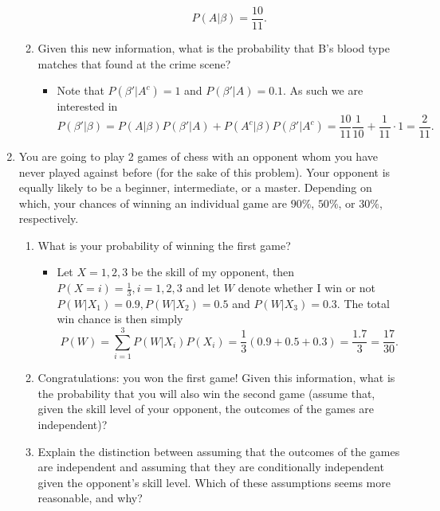 \documentclass{article}
\begin{document}
\begin{enumerate}
\begin{enumerate}
\begin{itemize}
					$$
					P(A|\beta) = \frac{10}{11}.
					$$
				\end{itemize}
			\item Given this new information, what is the probability that B’s blood type matches that found at the crime scene?
				\begin{itemize}
					\item Note that $P(\beta'|A^c) = 1$ and $P(\beta'|A) = 0.1$. As such we are interested in
					$$
					P(\beta'|\beta) = P(A|\beta)P(\beta'|A) + P(A^c|\beta)P(\beta'|A^c) = \frac{10}{11} \frac{1}{10} + \frac{1}{11} \cdot 1 = \frac{2}{11}.
					$$
				\end{itemize}
		\end{enumerate}
	\item You are going to play 2 games of chess with an opponent whom you have never played against before (for the sake of this problem). Your opponent is equally likely to be a beginner, intermediate, or a master. Depending on which, your chances of winning an individual game are $90\%$, $50\%$, or $30\%$, respectively.
		\begin{enumerate}
			\item What is your probability of winning the first game?
				\begin{itemize}
					\item Let $X = 1, 2, 3$ be the skill of my opponent, then $P(X = i) = \frac{1}{3}, i = 1, 2, 3$ and let $W$ denote whether I win or not $P(W|X_1) = 0.9, P(W|X_2) = 0.5$ and $P(W|X_3) = 0.3$. The total win chance is then simply
					$$
					P(W) = \sum_{i = 1}^3 P(W|X_i)P(X_i) = \frac{1}{3} \left(0.9 + 0.5 + 0.3 \right) = \frac{1.7}{3} = \frac{17}{30}.
					$$
				\end{itemize}
			\item Congratulations: you won the first game! Given this information, what is the probability that you will also win the second game (assume that, given the skill level of your opponent, the outcomes of the games are independent)?
			\item Explain the distinction between assuming that the outcomes of the games are independent and assuming that they are conditionally independent given the opponent’s skill level. Which of these assumptions seems more reasonable, and why?
		\end{enumerate}
\end{enumerate}
\end{document}
